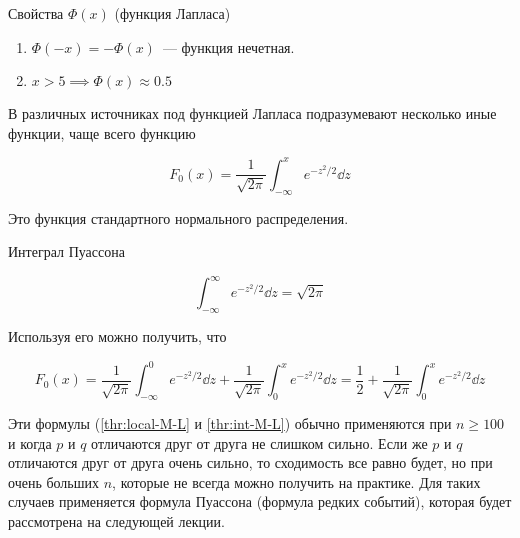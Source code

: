\begin{remark}
  Свойства \(\Phi(x)\) (функция Лапласа)

  \begin{enumerate}
  \item
    \(\Phi(-x) = -\Phi(x)\)~--- функция нечетная.

  \item
    \(x > 5 \implies \Phi(x) \approx 0.5\)
  \end{enumerate}
\end{remark}

\begin{remark}
  В различных источниках под функцией Лапласа подразумевают несколько
  иные функции, чаще всего функцию

  \begin{equation*}
    F_0 (x) = \frac{1}{\sqrt{2 \pi}} \int_{-\infty}^x e^{-z^2 / 2} \dd z
  \end{equation*}

  Это функция стандартного нормального распределения.
\end{remark}

\begin{remark}
  Интеграл Пуассона
  
  \begin{equation*}
    \int_{-\infty}^{\infty} e^{-z^2 / 2} \dd z = \sqrt{2 \pi}
  \end{equation*}

  Используя его можно получить, что

  \begin{equation*}
    F_0 (x)
    = \frac{1}{\sqrt{2 \pi}} \int_{-\infty}^0 e^{-z^2 / 2} \dd z
      + \frac{1}{\sqrt{2 \pi}} \int_0^x e^{-z^2 / 2} \dd z
    = \frac{1}{2} + \frac{1}{\sqrt{2 \pi}} \int_0^x e^{-z^2 / 2} \dd z
  \end{equation*}
\end{remark}

\begin{remark}
  Эти формулы (\ref{thr:local-M-L} и \ref{thr:int-M-L}) обычно применяются при
  \(n \ge 100\) и когда \(p\) и \(q\) отличаются друг от друга не слишком
  сильно. Если же \(p\) и \(q\) отличаются друг от друга очень сильно, то
  сходимость все равно будет, но при очень больших \(n\), которые не всегда
  можно получить на практике. Для таких случаев применяется формула Пуассона
  (формула редких событий), которая будет рассмотрена на следующей лекции.
\end{remark}


